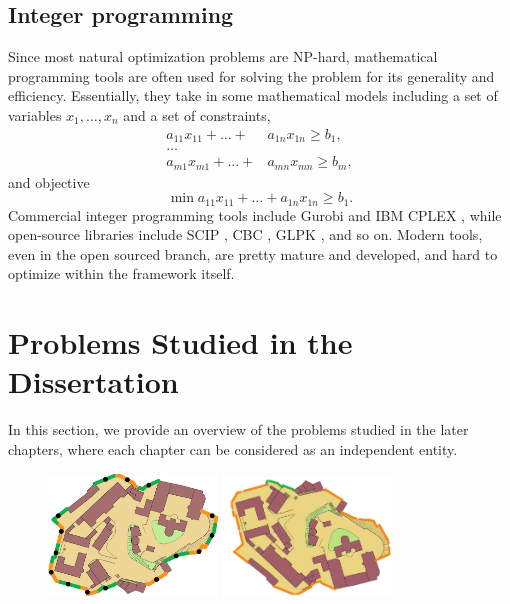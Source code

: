 \subsection{Integer programming}
Since most natural optimization problems are NP-hard, mathematical programming tools are often 
used for solving the problem for its generality and efficiency. Essentially, they take in
some mathematical models including a set of variables $x_1, \dots, x_n$ and a set of constraints,
\begin{align*}
    a_{11} x_{11} + \dots + & a_{1n} x_{1n} \geq b_1,\\
    \dots & \\
    a_{m1} x_{m1} + \dots + & a_{mn} x_{mn} \geq b_m,
\end{align*}
and objective 
\[
    \min a_{11} x_{11} + \dots + a_{1n} x_{1n} \geq b_1.
\]
Commercial integer programming tools include Gurobi \cite{optimization2019gurobi} and IBM CPLEX \cite{cplex2009v12}, while open-source 
libraries include SCIP \cite{achterberg2009scip}, CBC \cite{forrest2005cbc}, GLPK \cite{makhorin2008glpk}, and so on. 
Modern tools, even in the open sourced branch, are pretty mature and developed, and hard to optimize within the framework itself.
\section{Problems Studied in the Dissertation}
In this section, we provide an overview of the problems studied in the later chapters, 
where each chapter can be considered as an independent entity. 

\begin{figure}[ht]
    \centering
    \includegraphics[width = 0.4\textwidth]{chapters/opg/figures/castle_15-eps-converted-to.pdf}
    \includegraphics[width = 0.4\textwidth]{chapters/opg-ext/figures/opgmc-castle-thin-eps-converted-to.pdf}
    \label{fig:intro-opg}
\end{figure}

